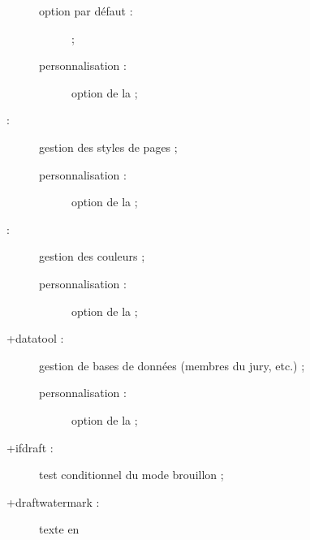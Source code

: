 \begin{description}
  \begin{description}
  \item[option par défaut :]  ;
  \item[personnalisation :] option  de la \yatCl ;
  \end{description}
\item[\package{titlesec} :] %
  gestion des styles de pages ;
  \begin{description}
  \item[personnalisation :] option  de la \yatCl ;
  \end{description}
\item[\package{xcolor} :] %
  gestion des couleurs ;
  \begin{description}
  \item[personnalisation :] option  de la \yatCl ;
  \end{description}
\item[\package*+{datatool} :] gestion de bases de données (membres du jury,
  etc.) ;
  \begin{description}
  \item[personnalisation :] option  de la \yatCl ;
  \end{description}
\item[\package*+{ifdraft} :] test conditionnel du mode brouillon ;
\item[\package+{draftwatermark} :] texte en

\end{description}
